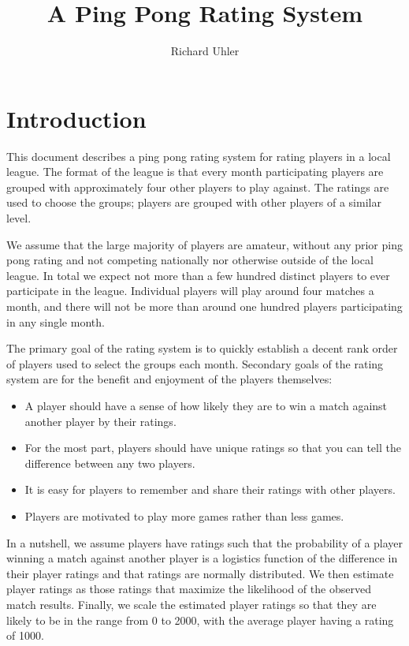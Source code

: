 \documentclass{article}
\begin{document}
\title{A Ping Pong Rating System}
\author{Richard Uhler}
\maketitle

\section{Introduction}
This document describes a ping pong rating system for rating players in a
local league. The format of the league is that every month participating
players are grouped with approximately four other players to play against. The
ratings are used to choose the groups; players are grouped with other players
of a similar level.

We assume that the large majority of players are amateur, without any prior
ping pong rating and not competing nationally nor otherwise outside of the
local league. In total we expect not more than a few hundred distinct players
to ever participate in the league. Individual players will play around four
matches a month, and there will not be more than around one hundred players
participating in any single month.

The primary goal of the rating system is to quickly establish a decent rank
order of players used to select the groups each month. Secondary goals of the
rating system are for the benefit and enjoyment of the players themselves:
\begin{itemize}
  \item A player should have a sense of how likely they are to win a match
    against another player by their ratings.
  \item For the most part, players should have unique ratings so that you can
    tell the difference between any two players.
  \item It is easy for players to remember and share their ratings with other
    players.
  \item Players are motivated to play more games rather than less games.
\end{itemize}

In a nutshell, we assume players have ratings such that the probability
of a player winning a match against another player is a logistics function of
the difference in their player ratings and that ratings are normally
distributed. We then estimate player ratings as those ratings that maximize
the likelihood of the observed match results. Finally, we scale the estimated
player ratings so that they are likely to be in the range from 0 to 2000, with
the average player having a rating of 1000.
\end{document}
